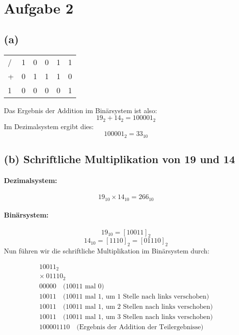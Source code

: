 \documentclass[a4paper]{scrartcl}
\begin{document}
\section*{Aufgabe 2}

\subsection*{(a)}

\begin{table}[H]
  \centering
  \begin{tabular}{llllll}
  / & 1 & 0 & 0 & 1 & 1 \\
  + & 0 & 1 & 1 & 1 & 0 \\
  1 & 0 & 0 & 0 & 0 & 1
  \end{tabular}
  \end{table}

Das Ergebnis der Addition im Binärsystem ist also:
\[
19_2 + 14_2 = 100001_2
\]
Im Dezimalsystem ergibt dies:
\[
100001_2 = 33_{10}
\]

\subsection*{(b) Schriftliche Multiplikation von 19 und 14}

\paragraph{Dezimalsystem:}
\[
19_{10} \times 14_{10} = 266_{10}
\]

\paragraph{Binärsystem:}
\[
19_{10} = [10011]_2
\]
\[
14_{10} = [1110]_2 = [01110]_2
\]
Nun führen wir die schriftliche Multiplikation im Binärsystem durch:

\[
\begin{array}{r}
    10011_2 \\
  \times \ 01110_2 \\
  \hline
     00000 \quad \text{(10011 mal 0)} \\
    10011  \quad \text{(10011 mal 1, um 1 Stelle nach links verschoben)} \\
   10011   \quad \text{(10011 mal 1, um 2 Stellen nach links verschoben)} \\
  10011    \quad \text{(10011 mal 1, um 3 Stellen nach links verschoben)} \\
  \hline
 100001110 \quad \text{(Ergebnis der Addition der Teilergebnisse)} \\
\end{array}
\]
\end{document}
